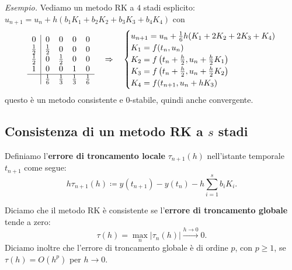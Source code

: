 \textit{Esempio.}
Vediamo un metodo RK a $4$ stadi esplicito: $u_{n+1} =u_{n} +h( b_{1} K_{1} +b_{2} K_{2} +b_{3} K_{3} +b_{4} K_{4})$ con
\begin{equation*}
\quad \begin{array}{ c|c c c c }
0 & 0 & 0 & 0 & 0\\
\frac{1}{2} & \frac{1}{2} & 0 & 0 & 0\\
\frac{1}{2} & 0 & \frac{1}{2} & 0 & 0\\
1 & 0 & 0 & 1 & 0\\
\hline
 & \frac{1}{6} & \frac{1}{3} & \frac{1}{3} & \frac{1}{6}
\end{array} \quad \Rightarrow \quad \begin{cases}
u_{n+1} =u_{n} +\frac{1}{6} h( K_{1} +2K_{2} +2K_{3} +K_{4})\\
K_{1} =f( t_{n} ,u_{n})\\
K_{2} =f\left( t_{n} +\frac{h}{2} ,u_{n} +\frac{h}{2} K_{1}\right)\\
K_{3} =f\left( t_{n} +\frac{h}{2} ,u_{n} +\frac{h}{2} K_{2}\right)\\
K_{4} =f( t_{n+1} ,u_{n} +hK_{3})
\end{cases}
\end{equation*}
questo è un metodo consistente e $0$-stabile, quindi anche convergente.

\subsection{Consistenza di un metodo RK a $s$ stadi}
\begin{definition}
Definiamo l'\textbf{errore di troncamento locale} $\tau _{n+1}(h)$ nell'istante temporale $t_{n+1}$ come segue:
\begin{equation*}
h\tau _{n+1}(h) \coloneqq y( t_{n+1}) -y( t_{n}) -h\sum\limits ^{s}_{i=1} b_{i} K_{i}.
\end{equation*}
\end{definition}

\begin{definition}[Consistenza]
Diciamo che il metodo RK è consistente se l'\textbf{errore di troncamento globale} tende a zero:
\begin{equation*}
\tau (h) =\max_{n}| \tau _{n}(h)| \xrightarrow{h\rightarrow 0} 0.
\end{equation*}
Diciamo inoltre che l'errore di troncamento globale è di ordine $p$, con $p \geqslant 1$, se $\tau (h) =O\left( h^{p}\right)$ per $h\rightarrow 0$.
\end{definition}

